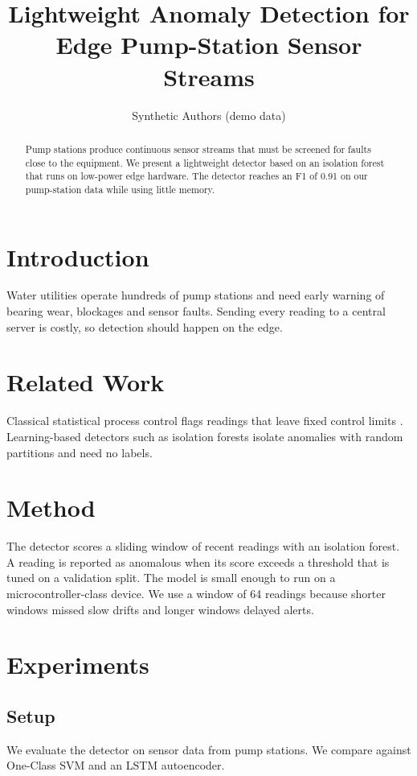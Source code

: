 \documentclass{article}
\title{Lightweight Anomaly Detection for Edge Pump-Station Sensor Streams}
\author{Synthetic Authors (demo data)}
\begin{document}
\maketitle

\begin{abstract}
Pump stations produce continuous sensor streams that must be screened for faults close to the equipment. We present a lightweight detector based on an isolation forest that runs on low-power edge hardware. The detector reaches an F1 of 0.91 on our pump-station data while using little memory.
\end{abstract}

\section{Introduction}
Water utilities operate hundreds of pump stations and need early warning of bearing wear, blockages and sensor faults. Sending every reading to a central server is costly, so detection should happen on the edge.

\section{Related Work}
Classical statistical process control flags readings that leave fixed control limits \cite{shewhart}. Learning-based detectors such as isolation forests \cite{liu2008} isolate anomalies with random partitions and need no labels.

\section{Method}
The detector scores a sliding window of recent readings with an isolation forest. A reading is reported as anomalous when its score exceeds a threshold that is tuned on a validation split. The model is small enough to run on a microcontroller-class device. We use a window of 64 readings because shorter windows missed slow drifts and longer windows delayed alerts.

\section{Experiments}
\subsection{Setup}
We evaluate the detector on sensor data from pump stations. We compare against One-Class SVM and an LSTM autoencoder.
\end{document}
